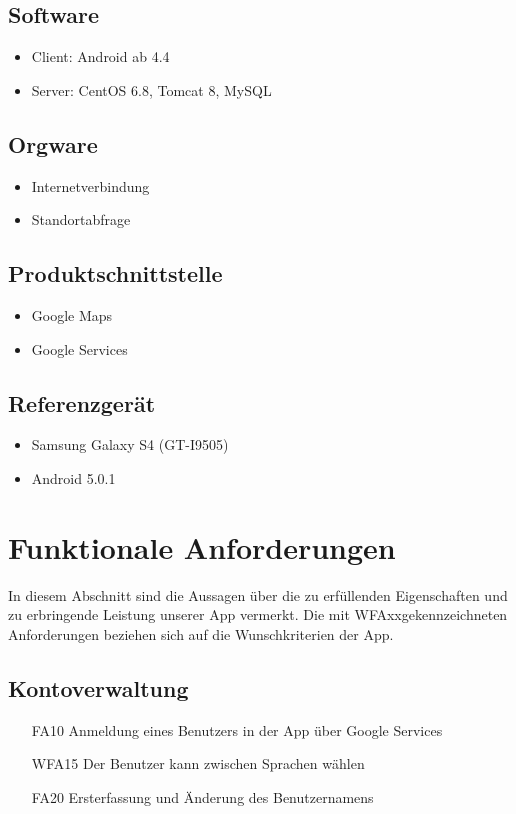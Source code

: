 \documentclass{scrartcl}
\begin{document}
	\subsection{Software}
	\begin{itemize}	        
		\item \gls{Client}: \gls{Android} ab 4.4
		\item \gls{Server}: CentOS 6.8, \gls{Tomcat} 8, MySQL
	\end{itemize}	
	\subsection{Orgware}
	\begin{itemize}	        
		\item Internetverbindung
		\item Standortabfrage
	\end{itemize}
	\subsection{Produktschnittstelle}
	\begin{itemize}	        
		\item Google Maps
		\item \gls{Google Services}
	\end{itemize}
	\subsection{Referenzgerät}
	\begin{itemize}
		\item Samsung Galaxy S4 (GT-I9505)
		\item \gls{Android} 5.0.1
	\end{itemize}
	\newpage
	
	
	\section{Funktionale Anforderungen}

	\renewcommand{\labelitemii}{$\bullet$}
	 In diesem Abschnitt sind die Aussagen über die zu erfüllenden Eigenschaften und zu erbringende Leistung unserer App vermerkt. Die mit \glqq WFAxx\grqq gekennzeichneten Anforderungen beziehen sich auf die Wunschkriterien der App.
	 
	\subsection{Kontoverwaltung}
	\begin{itemize}
	\hypertarget{FA10}{}
		\item[FA10] Anmeldung eines Benutzers in der App über \gls{Google Services}
		\hypertarget{WFA15}{}
		\item[WFA15] Der Benutzer kann zwischen Sprachen wählen
		\hypertarget{FA20}{}
		\item[FA20] Ersterfassung und Änderung des Benutzernamens
		
	\end{itemize}
	
\end{document}
